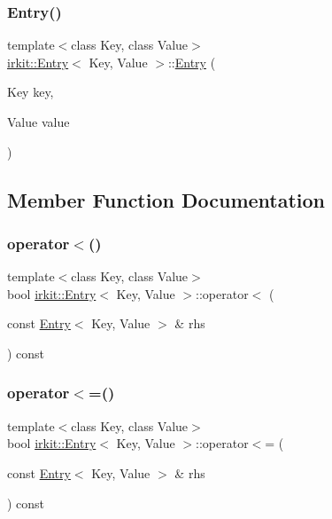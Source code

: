 \subsubsection{\texorpdfstring{Entry()}{Entry()}\hspace{0.1cm}{\footnotesize\ttfamily [2/2]}}
{\footnotesize\ttfamily template$<$class Key, class Value$>$ \\
\hyperlink{structirkit_1_1Entry}{irkit\+::\+Entry}$<$ Key, Value $>$\+::\hyperlink{structirkit_1_1Entry}{Entry} (\begin{DoxyParamCaption}\item[{Key}]{key,  }\item[{Value}]{value }\end{DoxyParamCaption})\hspace{0.3cm}{\ttfamily [inline]}}



\subsection{Member Function Documentation}
\mbox{\label{structirkit_1_1Entry_a4112e1db14a84edfe80b4e75ed8a328c}} 
\subsubsection{\texorpdfstring{operator$<$()}{operator<()}}
{\footnotesize\ttfamily template$<$class Key, class Value$>$ \\
bool \hyperlink{structirkit_1_1Entry}{irkit\+::\+Entry}$<$ Key, Value $>$\+::operator$<$ (\begin{DoxyParamCaption}\item[{const \hyperlink{structirkit_1_1Entry}{Entry}$<$ Key, Value $>$ \&}]{rhs }\end{DoxyParamCaption}) const\hspace{0.3cm}{\ttfamily [inline]}}

\mbox{\label{structirkit_1_1Entry_aa84e1aed3325a2c1bfef85b71a20ed74}} 
\subsubsection{\texorpdfstring{operator$<$=()}{operator<=()}}
{\footnotesize\ttfamily template$<$class Key, class Value$>$ \\
bool \hyperlink{structirkit_1_1Entry}{irkit\+::\+Entry}$<$ Key, Value $>$\+::operator$<$= (\begin{DoxyParamCaption}\item[{const \hyperlink{structirkit_1_1Entry}{Entry}$<$ Key, Value $>$ \&}]{rhs }\end{DoxyParamCaption}) const\hspace{0.3cm}{\ttfamily [inline]}}

